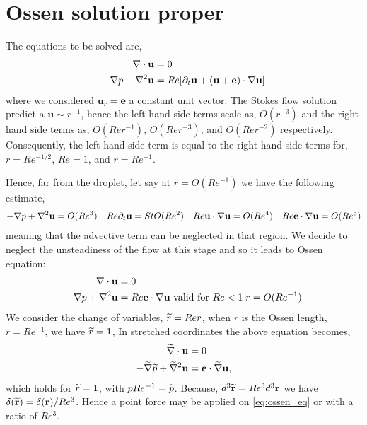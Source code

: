 \section{Ossen solution proper}

The equations to be solved are, 
\begin{align}
    \mathbf{\nabla}\cdot \textbf{u} &= 0
    \\
    -\mathbf{\nabla} p + \mathbf{\nabla}^2 \textbf{u}
    &= 
    Re [
    \partial_t \textbf{u}
    + (\textbf{u}+ \textbf{e})\cdot \mathbf{\nabla} \textbf{u}]
\end{align}
where we considered $\textbf{u}_r = \textbf{e}$ a constant unit vector. 
The Stokes flow solution predict a $\textbf{u}\sim r^{-1}$, hence the left-hand side terms scale as, $O(r^{-3})$ and the right-hand side terms as, $O(Re r^{-1})$, $O(Re r^{-3})$, and $O(Re r^{-2})$ respectively. 
Consequently, the left-hand side term is equal to the right-hand side terms for, $r =Re^{-1/2}$, $Re = 1$, and $r = Re^{-1}$. 

Hence, far from the droplet, let say at $r = O(Re^{-1})$ we have the following estimate, 
\begin{align}
    -\mathbf{\nabla} p + \mathbf{\nabla}^2 \textbf{u} = O(Re^3) &&
    Re \partial_t \textbf{u} = St O(Re^2) && 
    Re \textbf{u}\cdot \mathbf{\nabla} \textbf{u} = O(Re^4) && 
    Re \textbf{e}\cdot \mathbf{\nabla} \textbf{u} = O(Re^3) 
\end{align}
meaning that the advective term can be neglected in that region. 
We decide to neglect the unsteadiness of the flow at this stage and so it leads to Ossen equation: 
\begin{align}
    \div \textbf{u} &= 0
    \\
    -\grad p + \grad^2 \textbf{u}
    &= 
    Re  \textbf{e} \cdot \grad \textbf{u} 
    \text{  valid for } Re < 1\;  r = O(Re^{-1})
    \label{eq:ossen_eq}
\end{align}
We consider the change of variables, $\widetilde{r} = Re r$, when $r$ is the Ossen length, $r=Re^{-1}$, we have $\widetilde{r} = 1$,
In stretched coordinates the above equation becomes, 
\begin{align}
     \wt{\grad}\cdot  \textbf{u} &= 0
    \\
    - 
    \wt{\grad} \wt{p} +  \wt{\grad}^2 \textbf{u}
    &= 
    \textbf{e} \cdot \wt{\grad} \textbf{u}, 
    \label{eq:ossen_eq_streatching}
\end{align}
which holds for $\widetilde{r} = 1$, with $p Re^{-1}= \widetilde{p}$. 
Because, $d^3\widetilde{\textbf{r}}= Re^3 d^3 \textbf{r}$ we have $ \delta(\widetilde{\textbf{r}}) = \delta(\textbf{r})/Re^3$. Hence a point force may be applied on \ref{eq:ossen_eq} or \label{eq:ossen_eq_streatching} with a ratio of $Re^3$. 

